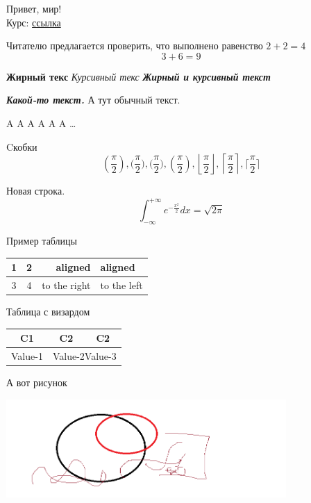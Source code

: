 


	Привет, мир!\\
	Курс: \href{https://www.youtube.com/watch?v=JFEM_HxhNnY&list=PL4_hYwCyhAvZtx63FR9d5_K0GMWF1XUc6}{ссылка}

	Читателю предлагается проверить, что выполнено равенство $2 + 2 = 4$
	\[ 3 + 6 = 9\]

	\textbf{Жирный текс}
	\textit{Курсивный текс}
	\textbf{\textit{Жирный и курсивный текст}}

	{ \bfseries \itshape \Large Какой-то текст.} А тут обычный текст.

	\Huge A
	\LARGE A
	\Large A
	\large A
	\normalsize A
	\small A
	\dots

	Cкобки
	\[ (\frac{\pi}{2}),
	   \big( \frac{\pi}{2} \big),
	   \bigg( \frac{\pi}{2} \bigg),
	   \left( \frac{\pi}{2} \right),
	   \left\lfloor \frac{\pi}{2} \right\rfloor,
	   \left\lceil \frac{\pi}{2} \right\rceil,
	   \bigg\lceil  \frac{\pi}{2} \bigg\rceil
	\]

	Новая строка.
	\[  \int_{- \infty}^{+ \infty} e^{- \frac{x^2}{2}} dx = \sqrt{2 \pi} \]

	Пример таблицы \\
	\begin{tabular}{||c|c|||r|l||}
		1 & 2 & aligned & aligned \\
		\hline
		3 & 4 & to the right & to the left \\
	\end{tabular}

    \vspace{10pt}

    Таблица с визардом \\
    \begin{tabular}{|c|c|c|}
	    \hline
	    C1 & C2 & C2 \\
	    \hline
	    Value-1 & \multicolumn{2}{c|}{Value-2Value-3} \\
	    \hline
    \end{tabular}

    \vspace{10pt}

    А вот рисунок \\

    \begin{center}
  	    \includegraphics[width=0.8\textwidth]{img/picture}
    \end{center}

